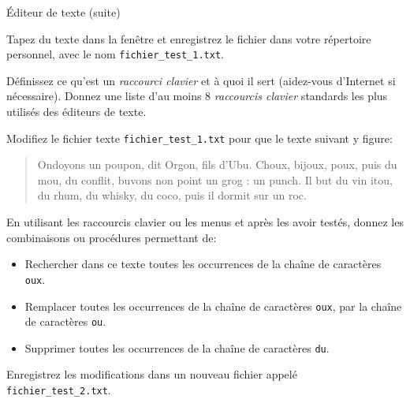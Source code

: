 \begin{exercice}
  \begin{exercicelet}{Éditeur de texte (suite)}
    \begin{questions}
    \item Tapez du texte dans la fenêtre et enregistrez le fichier dans
      votre répertoire personnel, avec le nom \verb|fichier_test_1.txt|.
    \item Définissez ce qu'est un \emph{raccourci clavier} et à quoi il
      sert (aidez-vous d'Internet si nécessaire).  Donnez une liste d'au
      moins 8 \emph{raccourcis clavier} standards les plus utilisés des
      éditeurs de texte.
    \item Modifiez le fichier texte \verb|fichier_test_1.txt| pour que
      le texte suivant y figure:
      \begin{quote}
        Ondoyons un poupon, dit Orgon, fils d'Ubu. Choux, bijoux, poux,
        puis du mou, du conflit, buvons non point un grog : un punch. Il
        but du vin itou, du rhum, du whisky, du coco, puis il dormit sur
        un roc.
      \end{quote}
    \item En utilisant les raccourcis clavier ou les menus et après les
      avoir testés, donnez les combinaisons ou procédures permettant de:
      \begin{itemize}
      \item Rechercher dans ce texte toutes les occurrences de la chaîne
        de caractères \texttt{oux}.
      \item Remplacer toutes les occurrences de la chaîne de caractères
        \texttt{oux}, par la chaîne de caractères \texttt{ou}.
      \item Supprimer toutes les occurrences de la chaîne de caractères
        \texttt{du}.
      \end{itemize}
    \item Enregistrez les modifications dans un nouveau fichier appelé
      \verb|fichier_test_2.txt|.
    \end{questions}
  \end{exercicelet}
\end{exercice}

